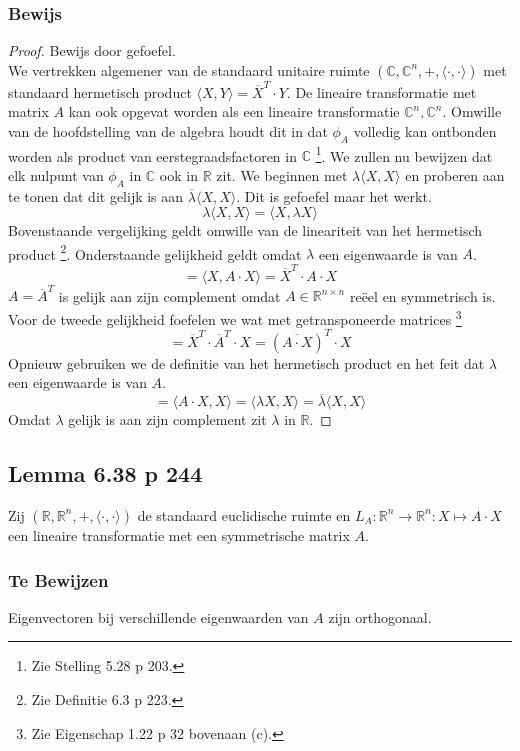 \documentclass[lineaire_algebra_oplossingen.tex]{subfiles}
\begin{document}
\subsubsection*{Bewijs}
\begin{proof}
Bewijs door gefoefel.\\
We vertrekken algemener van de standaard unitaire ruimte $(\mathbb{C},\mathbb{C}^n,+,\langle \cdot , \cdot \rangle)$ met standaard hermetisch product $\langle X,Y\rangle = \overline{X}^T \cdot Y$. De lineaire transformatie met matrix $A$ kan ook opgevat worden als een lineaire transformatie $\mathbb{C}^n,\mathbb{C}^n$. Omwille van de hoofdstelling van de algebra houdt dit in dat $\phi_A$ volledig kan ontbonden worden als product van eerstegraadsfactoren in $\mathbb{C}$ \footnote{Zie Stelling 5.28 p 203.}.
We zullen nu bewijzen dat elk nulpunt van $\phi_A$ in $\mathbb{C}$ ook in $\mathbb{R}$ zit.
We beginnen met $\lambda \langle X , X \rangle$ en proberen aan te tonen dat dit gelijk is aan $\overline{\lambda} \langle X , X \rangle$. Dit is gefoefel maar het werkt. 
\[
\lambda \langle X , X \rangle = \langle X , \lambda X \rangle
\]
Bovenstaande vergelijking geldt omwille van de lineariteit van het hermetisch product \footnote{Zie Definitie 6.3 p 223.}.
Onderstaande gelijkheid geldt omdat $\lambda$ een eigenwaarde is van $A$.
\[
= \langle X , A \cdot X \rangle = \overline{X}^T \cdot A \cdot X
\]
$A = \overline{A}^T$ is gelijk aan zijn complement omdat $A \in \mathbb{R}^{n\times n}$ re\"eel en symmetrisch is. Voor de tweede gelijkheid foefelen we wat met getransponeerde matrices \footnote{Zie Eigenschap 1.22 p 32 bovenaan (c).}
\[
= \overline{X}^T \cdot \overline{A}^T \cdot X = (\overline{A \cdot X})^T \cdot X
\]
Opnieuw gebruiken we de definitie van het hermetisch product en het feit dat $\lambda$ een eigenwaarde is van $A$.
\[
= \langle  A \cdot X ,X \rangle =  \langle \lambda X , X \rangle = \overline{\lambda} \langle X , X \rangle
\]
Omdat $\lambda$ gelijk is aan zijn complement zit $\lambda$ in $\mathbb{R}$.
\end{proof}

\subsection{Lemma 6.38 p 244}
Zij $(\mathbb{R},\mathbb{R}^n,+,\langle \cdot , \cdot \rangle)$ de standaard euclidische ruimte en $L_A : \mathbb{R}^n \rightarrow \mathbb{R}^n: X \mapsto A \cdot X$ een lineaire transformatie met een symmetrische matrix $A$.
\subsubsection*{Te Bewijzen}
Eigenvectoren bij verschillende eigenwaarden van $A$ zijn orthogonaal.
\end{document}

